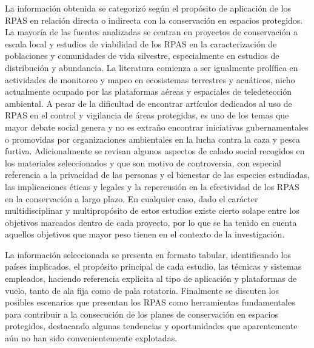 \documentclass[onecolumn]{extarticle}
\begin{document}
La información obtenida se categorizó según el propósito de aplicación
de los RPAS en relación directa o indirecta con la conservación en
espacios protegidos. La mayoría de las fuentes analizadas se centran en
proyectos de conservación a escala local y estudios de viabilidad de los
RPAS en la caracterización de poblaciones y comunidades de vida
silvestre, especialmente en estudios de distribución y abundancia. La
literatura comienza a ser igualmente prolífica en actividades de
monitoreo y mapeo en ecosistemas terrestres y acuáticos, nicho
actualmente ocupado por las plataformas aéreas y espaciales de
teledetección ambiental. A pesar de la dificultad de encontrar artículos
dedicados al uso de RPAS en el control y vigilancia de áreas protegidas,
es uno de los temas que mayor debate social genera y no es extraño
encontrar iniciativas gubernamentales o promovidas por organizaciones
ambientales en la lucha contra la caza y pesca furtiva. Adicionalmente
se revisan algunos aspectos de calado social recogidos en los materiales
seleccionados y que son motivo de controversia, con especial referencia
a la privacidad de las personas y el bienestar de las especies
estudiadas, las implicaciones éticas y legales y la repercusión en la
efectividad de los RPAS en la conservación a largo plazo. En cualquier
caso, dado el carácter multidisciplinar y multipropósito de estos
estudios existe cierto solape entre los objetivos marcados dentro de
cada proyecto, por lo que se ha tenido en cuenta aquellos objetivos que
mayor peso tienen en el contexto de la investigación.

La información seleccionada se presenta en formato tabular,
identificando los países implicados, el propósito principal de cada
estudio, las técnicas y sistemas empleados, haciendo referencia
explicita al tipo de aplicación y plataformas de vuelo, tanto de ala
fija como de pala rotatoria. Finalmente se discuten los posibles
escenarios que presentan los RPAS como herramientas fundamentales para
contribuir a la consecución de los planes de conservación en espacios
protegidos, destacando algunas tendencias y oportunidades que
aparentemente aún no han sido convenientemente explotadas.
\end{document}
